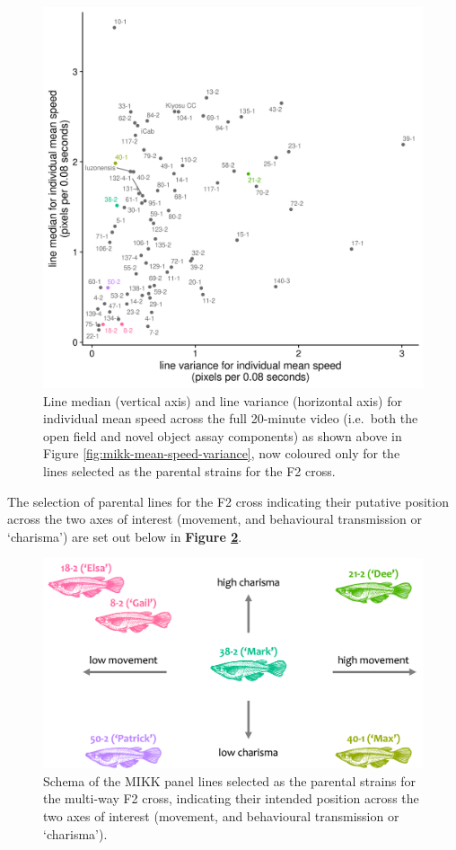\documentclass[
]{book}
\begin{document}
\begin{figure}
\includegraphics[width=1\linewidth]{figs/mikk_behaviour/line_mean_speed_variance_selected} \caption{Line median (vertical axis) and line variance (horizontal axis) for individual mean speed across the full 20-minute video (i.e.~both the open field and novel object assay components) as shown above in Figure \ref{fig:mikk-mean-speed-variance}, now coloured only for the lines selected as the parental strains for the F2 cross.}\label{fig:F0-line-mean-speed-var-select}
\end{figure}

The selection of parental lines for the F2 cross indicating their putative position across the two axes of interest (movement, and behavioural transmission or `charisma') are set out below in \textbf{Figure \ref{fig:F0-line-select-schema}}.



\begin{figure}
\includegraphics[width=1\linewidth]{figs/mikk_behaviour/line_selection_schema} \caption{Schema of the MIKK panel lines selected as the parental strains for the multi-way F2 cross, indicating their intended position across the two axes of interest (movement, and behavioural transmission or `charisma').}\label{fig:F0-line-select-schema}
\end{figure}
\end{document}
